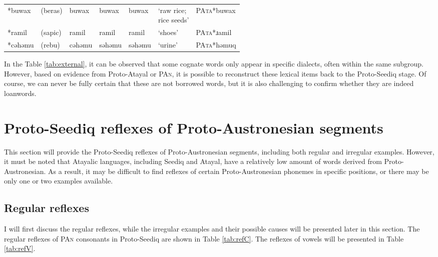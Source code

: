 \documentclass[12pt]{article}
\newcommand{\pan}{\textsc{PAn}\xspace}
\newcommand{\pata}{\textsc{PAta}\xspace}
\newcommand{\pataf}{Proto-Atayal\xspace}
\newcommand{\psedf}{Proto-Seediq\xspace}
\begin{document}
\begin{table}[!htbp]
\begin{tabular}{lllllll}
*buwax   & (beras)  & buwax        & buwax   & buwax   & \makecell[l]{`raw rice;\\rice seeds'} & \pata *buwax                                                        \\
*ramil   & (sapic)  & ramil        & ramil   & ramil   & `shoes'                               & \pata *ɹamil                                                        \\
*cəhəmu  & (rebu)   & cəhəmu       & səhəmu  & səhəmu  & `urine'                               & \pata *həmuq                                                       \\ \hline
\end{tabular}
\end{table}

In the Table \ref{tab:external}, it can be observed that some cognate words only appear in specific dialects, often within the same subgroup. However, based on evidence from \pataf or \pan, it is possible to reconstruct these lexical items back to the \psedf stage. Of course, we can never be fully certain that these are not borrowed words, but it is also challenging to confirm whether they are indeed loanwords.

\section{Proto-Seediq reflexes of Proto-Austronesian segments}

This section will provide the Proto-Seediq reflexes of Proto-Austronesian segments, including both regular and irregular examples. However, it must be noted that Atayalic languages, including Seediq and Atayal, have a relatively low amount of words derived from Proto-Austronesian. As a result, it may be difficult to find reflexes of certain Proto-Austronesian phonemes in specific positions, or there may be only one or two examples available.

\subsection{Regular reflexes}

I will first discuss the regular reflexes, while the irregular examples and their possible causes will be presented later in this section. The regular reflexes of \pan consonants in \psedf are shown in Table \ref{tab:refC}. The reflexes of vowels will be presented in Table \ref{tab:refV}.
\end{document}
